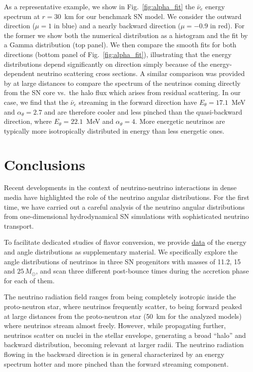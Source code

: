 \documentclass[iop,twocolappendix,numberedappendix]{emulateapj}
\begin{document}
As a representative example, we show in Fig.~\ref{fig:alpha_fit} the
$\bar\nu_e$ energy spectrum at $r=30$~km for our benchmark SN model. We consider the
outward direction ($\mu=1$ in blue) and a nearly backward direction
($\mu=-0.9$ in red). For the former we show both the numerical distribution
as a histogram and the fit by a Gamma distribution (top panel). We then compare the
smooth fits for both directions (bottom panel of Fig.~\ref{fig:alpha_fit}), illustrating that the 
energy distributions
depend significantly on direction simply because of the energy-dependent
neutrino scattering cross sections. A similar comparison was provided by
\cite{Sarikas:2012vb} at large distances to compare the spectrum of the
neutrinos coming directly from the SN core vs.\ the halo flux which arises
from residual scattering. In our case, we find that the $\bar\nu_e$ streaming
in the forward direction have $E_\theta=17.1$~MeV and
$\alpha_\theta=2.7$ and are therefore cooler and less pinched than the
quasi-backward direction, where $E_\theta=22.1$~MeV and
$\alpha_\theta=4$. More energetic neutrinos are typically more
isotropically distributed in energy than less energetic ones.


\section{Conclusions}\label{sec:conclusions}

Recent developments in the context of neutrino-neutrino interactions in dense
media have highlighted the role of the neutrino angular distributions. For
the first time, we have carried out a careful analysis of the neutrino
angular distributions from one-dimensional hydrodynamical SN simulations with
sophisticated neutrino transport.

To facilitate dedicated studies of flavor conversion, we provide \href{http://wwwmpa.mpa-garching.mpg.de/ccsnarchive/data/Tamborra2017/}
{data} of the
energy and angle distributions as supplementary
material. We specifically explore the angle distributions of neutrinos in
three SN progenitors with masses of 11.2, 15 and $25\,M_\odot$, and scan
three different post-bounce times during the accretion phase for each of
them.

The neutrino radiation field ranges from being completely isotropic inside
the proto-neutron star, where neutrinos frequently scatter, to being
forward peaked at large distances from the proto-neutron star (50~km for the
analyzed models) where neutrinos stream almost freely. However, while
propagating further, neutrinos scatter on nuclei in the stellar envelope,
generating a broad ``halo'' and backward distribution, becoming relevant at larger
radii. The neutrino radiation flowing in the backward direction is in general
characterized by an energy spectrum hotter and more pinched than the forward
streaming component.
\end{document}
